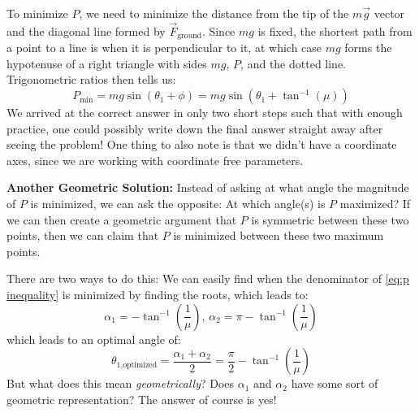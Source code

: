\documentclass{article}
\begin{document}
To minimize $P$, we need to minimize the distance from the tip of the $m\vec{g}$ vector and the diagonal line formed by $\vec{F}_\text{ground}$. Since $mg$ is fixed, the shortest path from a point to a line is when it is perpendicular to it, at which case $mg$ forms the hypotenuse of a right triangle with sides $mg$, $P$, and the dotted line. Trigonometric ratios then tells us:
\begin{equation}
    P_\text{min}=mg\sin(\theta_1+\phi)=mg\sin\left(\theta_1+\tan^{-1}\left(\mu\right)\right)
    \label{eq:}
\end{equation}
We arrived at the correct answer in only two short steps such that with enough practice, one could possibly write down the final answer straight away after seeing the problem! One thing to also note is that we didn't have a coordinate axes, since we are working with coordinate free parameters. 

\textbf{Another Geometric Solution:}
Instead of asking at what angle the magnitude of $P$ is minimized, we can ask the opposite: At which angle(s) is $P$ maximized? If we can then create a geometric argument that $P$ is symmetric between these two points, then we can claim that $P$ is minimized between these two maximum points.

There are two ways to do this: We can easily find when the denominator of \ref{eq:p inequality} is minimized by finding the roots, which leads to:
\begin{equation}
    \alpha_1 = -\tan^{-1}\left(\frac{1}{\mu}\right),\, \alpha_2 = \pi-\tan^{-1}\left(\frac{1}{\mu}\right)
    \label{eq:minimal angles}
\end{equation}
which leads to an optimal angle of:
\begin{equation}
    \theta_\text{1,optimized}=\frac{\alpha_1+\alpha_2}{2}=\frac{\pi}{2}-\tan^{-1}\left(\frac{1}{\mu}\right)
    \label{eq:}
\end{equation}
But what does this mean \textit{geometrically}? Does $\alpha_1$ and $\alpha_2$ have some sort of geometric representation? The answer of course is yes!
\end{document}
